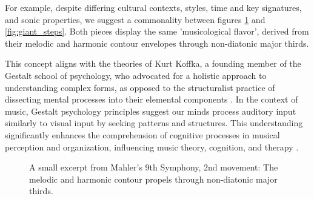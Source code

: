 For example, despite differing cultural contexts, styles, time and key signatures, and sonic properties, we suggest a commonality between figures \ref{fig:mahler} and \ref{fig:giant_steps}. Both pieces display the same 'musicological flavor', derived from their melodic and harmonic contour envelopes through non-diatonic major thirds.

This concept aligns with the theories of Kurt Koffka, a founding member of the Gestalt school of psychology, who advocated for a holistic approach to understanding complex forms, as opposed to the structuralist practice of dissecting mental processes into their elemental components \cite{Koffka2013PrinciplesPsychology}. In the context of music, Gestalt psychology principles suggest our minds process auditory input similarly to visual input by seeking patterns and structures. This understanding significantly enhances the comprehension of cognitive processes in musical perception and organization, influencing music theory, cognition, and therapy \cite{Lerdahl1985AMusic}.

\begin{figure}[ht]
    \centering
    \caption[Mahler's 9th Symphony, 2nd movement]{\small{A small excerpt from Mahler's 9th Symphony, 2nd movement: The melodic and harmonic contour propels through non-diatonic major thirds.}}
    \label{fig:mahler}
\end{figure}


